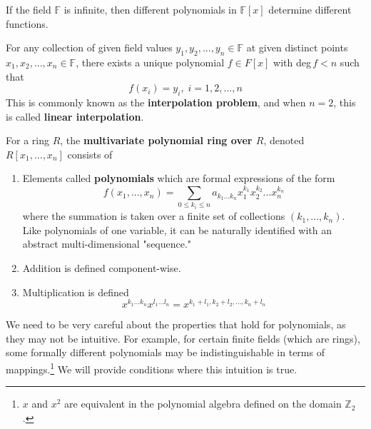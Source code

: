  \begin{theorem}
    If the field $\mathbb{F}$ is infinite, then different polynomials in $\mathbb{F}[x]$ determine different functions. 
  \end{theorem}

  \begin{theorem}[Interpolation]
    For any collection of given field values $y_1, y_2, ..., y_n \in \mathbb{F}$ at given distinct points $x_1, x_2, ..., x_n \in \mathbb{F}$, there exists a unique polynomial $f \in F[x]$ with deg$\, f < n$ such that
    \begin{equation}
      f(x_i) = y_i, \; i = 1, 2, ..., n
    \end{equation}
    This is commonly known as the \textbf{interpolation problem}, and when $n = 2$, this is called \textbf{linear interpolation}. 
  \end{theorem}

  \begin{definition} 
    For a ring $R$, the \textbf{multivariate polynomial ring over $R$}, denoted $R[x_1, \ldots, x_n]$ consists of 
    \begin{enumerate}
      \item Elements called \textbf{polynomials} which are formal expressions of the form 
      \begin{equation}
        f(x_1, ..., x_n) =  \sum_{0 \leq k_i \leq n} a_{k_1 ... k_n} x_1^{k_1} x_2^{k_2} ... x_n^{k_n}
      \end{equation}
      where the summation is taken over a finite set of collections $(k_1, ..., k_n)$. Like polynomials of one variable, it can be naturally identified with an abstract multi-dimensional "sequence." 

      \item Addition is defined component-wise. 

      \item Multiplication is defined 
      \begin{equation}
        x^{k_1 \ldots k_n} x^{l_1 \ldots l_n} = x^{k_1 + l_1, k_2 + l_2, \ldots, k_n + l_n}
      \end{equation}
    \end{enumerate}
  \end{definition}

  We need to be very careful about the properties that hold for polynomials, as they may not be intuitive. For example, for certain finite fields (which are rings), some formally different polynomials may be indistinguishable in terms of mappings.\footnote{$x$ and $x^2$ are equivalent in the polynomial algebra defined on the domain $\mathbb{Z}_2$. } We will provide conditions where this intuition is true.  


